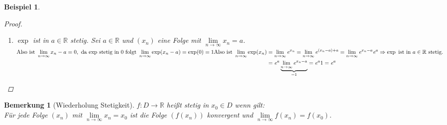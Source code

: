 \documentclass[a4paper,titlepage,oneside]{article}
\def\R{\ensuremath{\mathbb{R}} }
\def\e{\ensuremath{\mathit{e}} }
\renewcommand{\liminf}[2][n]{\ensuremath{\lim\limits_{#1 \rightarrow \infty}{#2}}}
\theoremstyle{thmstyle}
\newtheorem{bsp}[satz]{Beispiel}
\newtheorem{bem}[satz]{Bemerkung}
\theoremstyle{subthmstyle}
\begin{document}
\begin{bsp}
\begin{enumerate}
\begin{proof}
\begin{enumerate}
\item $\exp$ ist in $a \in \R$ stetig. Sei $ a \in \R $ und $ (x_n) $ eine Folge mit $ \liminf{x_n} = a$.\\
\begin{math}\displaystyle 
\text{Also ist } \liminf{x_n - a} = 0, \text{ da $\exp$ stetig in $0$ folgt } \liminf{\exp(x_n -a)} = \exp(0) = 1 \\
\begin{aligned}[t]\text{Also ist }\liminf{\exp(x_n)} &= \liminf{\e^{x_n}} = \liminf{\e^{(x_n - a)+a}} = \liminf{\e^{x_n-a} \e^a} \\
&= \e^a \underbrace{\liminf{\e^{x_n-a}}}_{=1} = \e^a 1 = \e^a \end{aligned}\\
\Rightarrow \exp \text{ ist in } a \in \R \text{ stetig.}
\end{math} 
\end{enumerate}
\end{proof}
\end{enumerate}
\end{bsp}

\begin{bem}[Wiederholung Stetigkeit]
$ f: D \to \R $ heißt stetig in $x_0 \in D$ wenn gilt: \\
Für jede Folge $(x_n)$ mit $\liminf{x_n} = x_0$ ist die Folge $(f(x_n))$ konvergent und $\liminf{f(x_n)} = f(x_0)$.
\end{bem}
\end{document}
